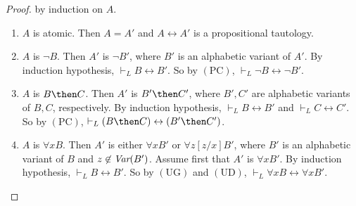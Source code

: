 \documentclass[11pt]{woarticle}
\theoremstyle{break}
\theoremstyle{nonumberplain}
\newcommand{\1}{\;\,|\;\,}
\newcommand{\var}{\emph{Var}}
\newcommand{\T}[1]{\ensuremath{(\mathrm{ #1})}}
\begin{document}
\begin{proof} by induction on $A$.
  \begin{enumerate}
  \item $A$ is atomic.\; Then $A=A'$ and $A \leftrightarrow A'$ is a
    propositional tautology.
  \item $A$ is $\neg B$.\; Then $A'$ is $\neg B'$, where $B'$ is an
    alphabetic variant of $A'$. By induction hypothesis, $\vdash_{L} B
    \leftrightarrow B'$. So by \T{PC}, $\vdash_{L} \neg B
    \leftrightarrow \neg B'$.
  \item $A$ is $B \then C$.\; Then $A'$ is $B' \then C'$, where
    $B',C'$ are alphabetic variants of $B,C$, respectively. By
    induction hypothesis, $\vdash_{L} B \leftrightarrow B'$ and
    $\vdash_{L} C \leftrightarrow C'$. So by \T{PC}, $\vdash_{L} (B
    \then C) \leftrightarrow (B' \then C')$.
  \item $A$ is $\forall x B$.\; Then $A'$ is either $\forall x B'$ or
    $\forall z [z/x]B'$, where $B'$ is an alphabetic variant of $B$
    and $z\not\in \var(B')$. Assume first that $A'$ is $\forall x
    B'$. By induction hypothesis, $\vdash_{L} B \leftrightarrow
    B'$. So by \T{UG} and \T{UD}, $\vdash_{L} \forall x B
    \leftrightarrow \forall x B'$.


\end{enumerate}
\end{proof}
\end{document}

